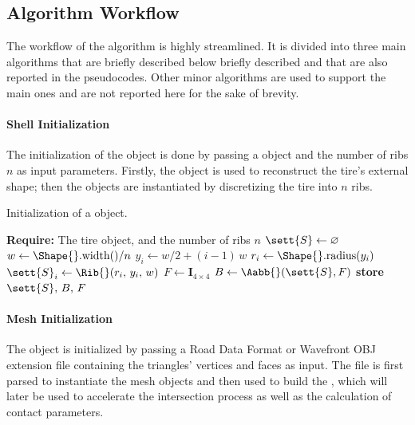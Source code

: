 \subsection{Algorithm Workflow}
\label{app2:sec:algorithm_workflow}

The workflow of the algorithm is highly streamlined. It is divided into three main algorithms that are briefly described below briefly described and that are also reported in the pseudocodes. Other minor algorithms are used to support the main ones and are not reported here for the sake of brevity.

\paragraph{Shell Initialization}
The initialization of the \Shell{} object is done by passing a \Shape{} object and the number of ribs $n$ as input parameters. Firstly, the \Shape{} object is used to reconstruct the tire's external shape; then the \Rib{} objects are instantiated by discretizing the tire into $n$ ribs.

\begin{breakablealgorithm}
  \caption{Initialization of a \Shell{} object.}
  \label{app2:alg:shell}
  \begin{algorithmic}[1]
    \State \textbf{Require:} The tire \Shape{} object, and the number of ribs $n$
     
      \State $\sett{S} \gets \varnothing$ 
      \State $w \gets \Shape{}.\text{width}()/n$ 
        \State $y_i \gets w/2 + (i-1)\,w$ 
        \State $r_i \gets \Shape{}.\text{radius}(y_i)$ 
        \State $\sett{S}_i \gets \Rib{}(r_i, \, y_i, \, w)$ 
      \EndFor
      \State $F \gets \mathbf{I}_{4 \times 4}$ 
      \State $B \gets \Aabb{}(\sett{S}, F)$ 
      \State \textbf{store} $\sett{S}, \, B, \, F$ 
      \EndFunction
  \end{algorithmic}
\end{breakablealgorithm}

\paragraph{Mesh Initialization}
The \Mesh{} object is initialized by passing a Road Data Format or Wavefront OBJ extension file containing the triangles' vertices and faces as input. The file is first parsed to instantiate the mesh \TriangleGround{} objects and then used to build the \AabbTree{}, which will later be used to accelerate the intersection process as well as the calculation of contact parameters.

